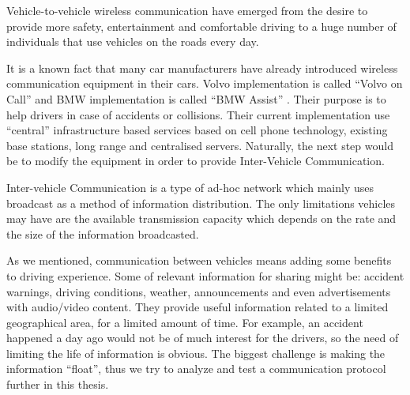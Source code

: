 Vehicle-to-vehicle wireless communication have emerged from the desire to
provide more safety, entertainment and comfortable driving to a huge number of
individuals that use vehicles on the roads every day.

It is a known fact that many car manufacturers have already introduced wireless
communication equipment in their cars. Volvo implementation is called ``Volvo on
Call'' \citep{volvo} and BMW implementation is called ``BMW Assist''
\cite{bmw_assist}. Their purpose is to help drivers in case of accidents or
collisions. Their current implementation use ``central'' infrastructure based
services based on cell phone technology, existing base stations, long range and
centralised servers. Naturally, the next step would be to modify the equipment
in order to provide Inter-Vehicle Communication.

Inter-vehicle Communication is a type of ad-hoc network which mainly uses
broadcast as a method of information distribution. The only limitations vehicles
may have are the available transmission capacity which depends on the rate and
the size of the information broadcasted.

As we mentioned, communication between vehicles means adding some benefits to
driving experience. Some of relevant information for sharing might be: accident
warnings, driving conditions, weather, announcements and even advertisements
with audio/video content. They provide useful information related to a limited
geographical area, for a limited amount of time. For example, an accident
happened a day ago would not be of much interest for the drivers, so the need of
limiting the life of information is obvious. The biggest challenge is making
the information ``float'', thus we try to analyze and test a communication
protocol further in this thesis.

